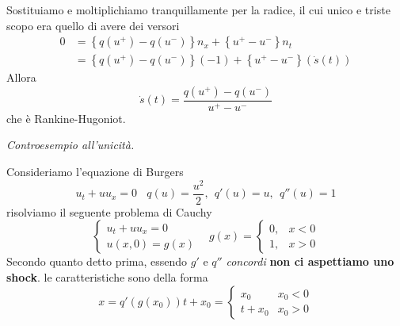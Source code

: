 \documentclass[10pt,a4paper,twoside,openright]{book}
\begin{document}
\begin{dimostrazione}
\begin{equation*}
    \end{equation*}
    Sostituiamo e moltiplichiamo tranquillamente per la radice, il cui unico e triste scopo era quello di avere dei versori
    \begin{align*}
        0 & =\left\{q\left(u^{+}\right) -q\left(u^{-}\right)\right\} n_{x} +\left\{u^{+} -u^{-}\right\} n_{t}     \\
          & =\left\{q\left(u^{+}\right) -q\left(u^{-}\right)\right\}(-1) +\left\{u^{+} -u^{-}\right\}(\dot{s}(t))
    \end{align*}
    Allora
    \begin{equation*}
        \dot{s}(t) =\frac{q\left(u^{+}\right) -q\left(u^{-}\right)}{u^{+} -u^{-}}
    \end{equation*}
    che è Rankine-Hugoniot.
\end{dimostrazione}

\textit{Controesempio all'unicità.}

Consideriamo l'equazione di Burgers
\begin{equation}
    u_{t} +uu_{x} =0\ \ \ \ q(u) =\frac{u^{2}}{2} ,\ \ q'(u) =u,\ \ q''(u) =1
\end{equation}
risolviamo il seguente problema di Cauchy
\begin{equation*}
    \begin{cases}
        u_{t} +uu_{x} =0 \\
        u(x,0) =g(x)
    \end{cases} \ \ \ \ g(x) =
    \begin{cases}
        0, & x< 0 \\
        1, & x >0
    \end{cases}
\end{equation*}
Secondo quanto detto prima, essendo $g'$ e $q''$ \emph{concordi} \textbf{non ci aspettiamo uno shock}.
le caratteristiche sono della forma
\begin{equation*}
    x=q'(g(x_{0})) t+x_{0} =
    \begin{cases}
        x_{0}   & x_{0} < 0 \\
        t+x_{0} & x_{0}  >0
    \end{cases}
\end{equation*}
\end{document}
